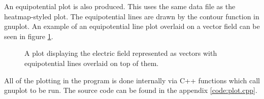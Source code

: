 An equipotential plot is also produced. This uses the same data file as the heatmap-styled plot. The equipotential lines are drawn by the contour function in gnuplot. An example of an equipotential line plot overlaid on a vector field can be seen in figure \ref{fig:vectors_and_contours}.

\begin{figure}[h!]
    \centering
    \setlength\fboxsep{0pt}
    \setlength\fboxrule{0.5pt}
    \caption{A plot displaying the electric field represented as vectors with equipotential lines overlaid on top of them.}
    \label{fig:vectors_and_contours}
\end{figure}

All of the plotting in the program is done internally via C++ functions which call gnuplot to be run. The source code can be found in the appendix \ref{code:plot.cpp}. %

